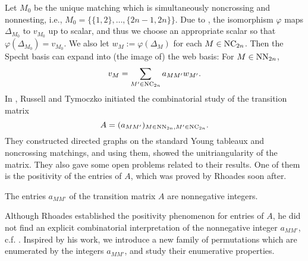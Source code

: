 Let \( M_0 \) be the unique matching which is simultaneously noncrossing and
nonnesting, i.e., \( M_0 = \{ \{1,2\},\dots,\{2n-1,2n\} \} \).
Due to \cite{RT19}, the isomorphism \( \varphi \) maps \( \Delta_{M_0} \)
to \( v_{M_0} \) up to scalar, and thus we choose an appropriate scalar so that
\( \varphi(\Delta_{M_0}) = v_{M_0} \).
We also let \( w_M := \varphi(\Delta_M) \) for each \( M\in\operatorname{NC}_{2n} \).
Then the Specht basis can expand into (the image of) the web basis:
For \( M\in\operatorname{NN}_{2n} \),
\[
  v_M = \sum_{M'\in\operatorname{NC}_{2n}} a_{MM'} w_{M'}.
\]
In \cite{RT19}, Russell and Tymoczko initiated the combinatorial study of
the transition matrix
\[
  A = (a_{MM'})_{M\in\operatorname{NN}_{2n}, M'\in\operatorname{NC}_{2n}}.
\]
They constructed directed graphs on the standard
Young tableaux and noncrossing matchings, and using them,
showed the unitriangularity of the matrix.
They also gave some open problems related to their results.
One of them is the positivity of the entries of \( A \),
which was proved by Rhoades soon after.
\begin{thm}
  The entries \( a_{MM'} \) of the transition matrix \( A \) are
  nonnegative integers.
\end{thm}
Although Rhoades established the positivity phenomenon for entries of \( A \),
he did not find an explicit combinatorial interpretation of the nonnegative integer \( a_{MM'} \), c.f. \cite[Problem 1.3]{Rho19}.
Inspired by his work, we introduce a new family of permutations which
are enumerated by the integers \( a_{MM'} \), and study their enumerative
properties.

